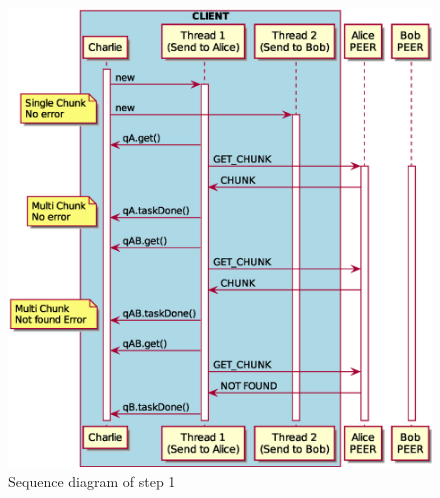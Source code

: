 \begin{figure}
	\centering
	\includegraphics[width=\textwidth]{img/step1.eps}
	\caption{Sequence diagram of step 1}
	\label{fig:step1}
\end{figure}